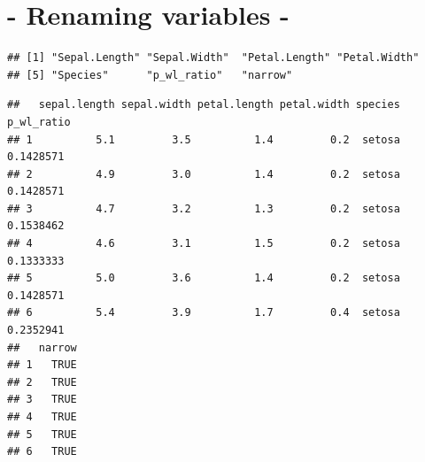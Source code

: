 \documentclass[]{article}
\newenvironment{Shaded}{\begin{snugshade}}{\end{snugshade}}
\newcommand{\CommentTok}[1]{\textcolor[rgb]{0.56,0.35,0.01}{\textit{#1}}}
\newcommand{\DataTypeTok}[1]{\textcolor[rgb]{0.13,0.29,0.53}{#1}}
\newcommand{\FloatTok}[1]{\textcolor[rgb]{0.00,0.00,0.81}{#1}}
\newcommand{\KeywordTok}[1]{\textcolor[rgb]{0.13,0.29,0.53}{\textbf{#1}}}
\newcommand{\NormalTok}[1]{#1}
\newcommand{\OperatorTok}[1]{\textcolor[rgb]{0.81,0.36,0.00}{\textbf{#1}}}
\newcommand{\OtherTok}[1]{\textcolor[rgb]{0.56,0.35,0.01}{#1}}
\newcommand{\StringTok}[1]{\textcolor[rgb]{0.31,0.60,0.02}{#1}}
\begin{document}
\begin{Shaded}
\end{Shaded}

\hypertarget{renaming-variables--}{%
\section{- Renaming variables -}\label{renaming-variables--}}

\begin{Shaded}
\end{Shaded}

\begin{verbatim}
## [1] "Sepal.Length" "Sepal.Width"  "Petal.Length" "Petal.Width" 
## [5] "Species"      "p_wl_ratio"   "narrow"
\end{verbatim}

\begin{Shaded}
\end{Shaded}

\begin{verbatim}
##   sepal.length sepal.width petal.length petal.width species p_wl_ratio
## 1          5.1         3.5          1.4         0.2  setosa  0.1428571
## 2          4.9         3.0          1.4         0.2  setosa  0.1428571
## 3          4.7         3.2          1.3         0.2  setosa  0.1538462
## 4          4.6         3.1          1.5         0.2  setosa  0.1333333
## 5          5.0         3.6          1.4         0.2  setosa  0.1428571
## 6          5.4         3.9          1.7         0.4  setosa  0.2352941
##   narrow
## 1   TRUE
## 2   TRUE
## 3   TRUE
## 4   TRUE
## 5   TRUE
## 6   TRUE
\end{verbatim}
\end{document}
